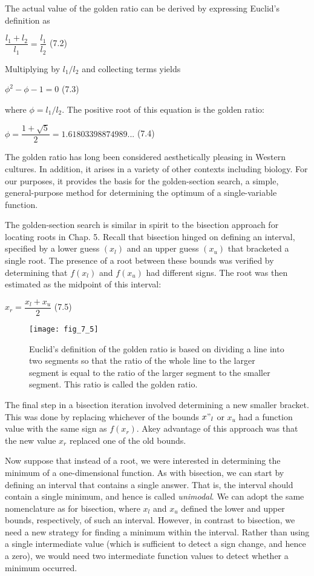 \documentclass[../main.tex]{subfiles}
\begin{document}
The actual value of the golden ratio can be derived by expressing Euclid's definition as
\medskip

$\dfrac{l_1+l_2}{l_1}=\dfrac{l_1}{l_2}$ \hfill {(7.2)}
\medskip

\noindent Multiplying by $l_1/l_2$ and collecting terms yields
\medskip

$\phi^2-\phi-1=0$ \hfill {(7.3)}
\medskip

\noindent where $\phi=l_1/l_2$. The positive root of this equation is the golden ratio:

$\phi = \dfrac{1+\sqrt{5}}{2}=1.61803398874989...$ \hfill {(7.4)}
\medskip

The golden ratio has long been considered aesthetically pleasing in Western cultures.
In addition, it arises in a variety of other contexts including biology. For our purposes, it
provides the basis for the golden-section search, a simple, general-purpose method for determining
the optimum of a single-variable function.

The golden-section search is similar in spirit to the bisection approach for locating
roots in Chap. 5. Recall that bisection hinged on defining an interval, specified by a lower
guess $(x_l)$ and an upper guess $(x_u)$ that bracketed a single root. The presence of a root between
these bounds was verified by determining that $f(x_l)$ and $f(x_u)$ had different signs.
The root was then estimated as the midpoint of this interval:
\medskip

$x_r=\dfrac{x_l+x_u}{2}$ \hfill {(7.5)}
\medskip

\begin{figure}[H]
	\centering
	\texttt{[image: fig\_7\_5]}
	\caption{\textsf{Euclid's definition of the golden ratio is based on dividing a line into two segments so that the
	ratio of the whole line to the larger segment is equal to the ratio of the larger segment to the
	smaller segment. This ratio is called the golden ratio.}}
	\label{fig:fig_7_5}
\end{figure}

The final step in a bisection iteration involved determining a new smaller bracket. This was
done by replacing whichever of the bounds $x"_l$ or $x_u$ had a function value with the same sign
as $f(x_r)$. Akey advantage of this approach was that the new value $x_r$ replaced one of the old
bounds.

Now suppose that instead of a root, we were interested in determining the minimum of
a one-dimensional function. As with bisection, we can start by defining an interval that
contains a single answer. That is, the interval should contain a single minimum, and hence
is called \textit{unimodal}. We can adopt the same nomenclature as for bisection, where $x_l$ and $x_u$
defined the lower and upper bounds, respectively, of such an interval. However, in contrast
to bisection, we need a new strategy for finding a minimum within the interval. Rather than
using a single intermediate value (which is sufficient to detect a sign change, and hence a
zero), we would need two intermediate function values to detect whether a minimum
occurred.
\end{document}
